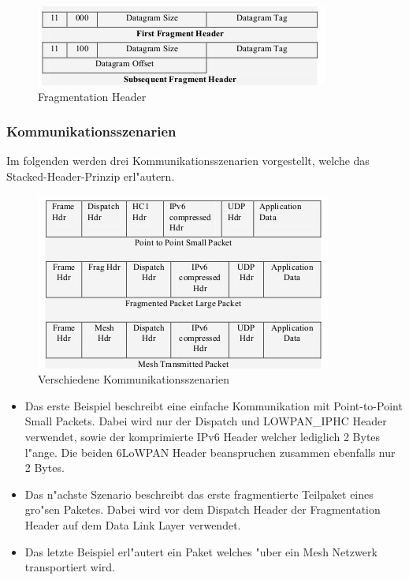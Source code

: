 \documentclass[final]{lktseminar}
\begin{document}
\begin{figure}[h]
    \centering
    \includegraphics{fragment_header.png}
    \caption{Fragmentation Header \cite{6lowpan_architecture}}
    \label{fig:Fragmentation Header}
\end{figure}


\subsubsection{Kommunikationsszenarien}
\label{sec: Kommunikationsszenarien}

Im folgenden werden drei Kommunikationsszenarien vorgestellt, welche das Stacked-Header-Prinzip erl"autern.
\begin{figure}[h]
    \centering
    \includegraphics{kommunikationsszenario.png}
    \caption{Verschiedene Kommunikationsszenarien \cite{6lowpan_demystified}}
    \label{fig:Kommunikationsszenarien}
\end{figure}

\begin{itemize}
    \item Das erste Beispiel beschreibt eine einfache Kommunikation mit Point-to-Point Small Packets. Dabei wird nur
    der Dispatch und LOWPAN\_IPHC Header verwendet, sowie der komprimierte IPv6 Header welcher lediglich 2 Bytes l"ange. Die beiden
    6LoWPAN Header beanspruchen zusammen ebenfalls nur 2 Bytes.
    \item Das n"achste Szenario beschreibt das erste fragmentierte Teilpaket eines gro"sen Paketes. Dabei wird vor dem Dispatch Header der
    Fragmentation Header auf dem Data Link Layer verwendet.
    \item Das letzte Beispiel erl"autert ein Paket welches "uber ein Mesh Netzwerk transportiert wird.

\end{itemize}
\newpage
\end{document}
